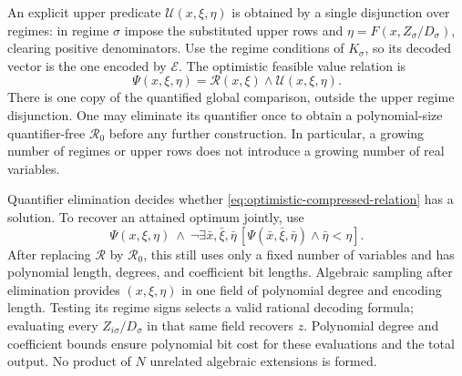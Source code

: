 An explicit upper predicate $\mathcal U(x,\xi,\eta)$ is obtained by a
single disjunction over regimes: in regime $\sigma$ impose the
substituted upper rows and $\eta=F(x,Z_\sigma/D_\sigma)$, clearing
positive denominators. Use the regime conditions of $K_\sigma$, so its
decoded vector is the one encoded by $\mathcal E$. The optimistic
feasible value relation is
\begin{equation}\label{eq:optimistic-compressed-relation}
 \Psi(x,\xi,\eta)=\mathcal R(x,\xi)\wedge
                                      \mathcal U(x,\xi,\eta).
\end{equation}
There is one copy of the quantified global comparison, outside the upper
regime disjunction. One may eliminate its quantifier once to obtain a
polynomial-size quantifier-free $\mathcal R_0$ before any further
construction. In particular, a growing number of regimes or upper rows
does not introduce a growing number of real variables.

Quantifier elimination decides whether \eqref{eq:optimistic-compressed-relation}
has a solution. To recover an attained optimum jointly, use
\begin{equation}\label{eq:joint-optimum-formula}
 \Psi(x,\xi,\eta)\ \wedge\
 \neg\exists\bar x,\bar\xi,\bar\eta\,
                 [\Psi(\bar x,\bar\xi,\bar\eta)\wedge\bar\eta<\eta].
\end{equation}
After replacing $\mathcal R$ by $\mathcal R_0$, this still uses only a
fixed number of variables and has polynomial length, degrees, and
coefficient bit lengths. Algebraic sampling after elimination provides
$(x,\xi,\eta)$ in one field of polynomial degree and encoding length.
Testing its regime signs selects a valid rational decoding formula;
evaluating every $Z_{i\sigma}/D_\sigma$ in that same field recovers $z$.
Polynomial degree and coefficient bounds ensure polynomial bit cost for
these evaluations and the total output. No product of $N$ unrelated
algebraic extensions is formed.

